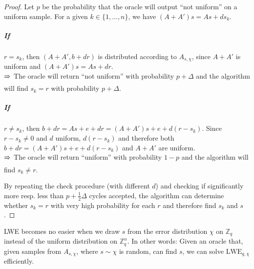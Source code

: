 \documentclass{report}
\newcommand{\Z}{\mathbb{Z}}
\begin{document}
\begin{proof}
Let $p$ be the probability that the oracle will output ``not uniform'' on a uniform sample. For a given $k \in \{ 1, ..., n\}$, we have $(A + A')s = As + ds_k$.

\subparagraph{If} $r = s_k$, then $(A + A', b + dr)$ is distributed according to $A_{s, \chi}$, since $A + A'$ is uniform and $(A + A')s = As + dr$.
\\$\xRightarrow{}$ The oracle will return ``not uniform'' with probability $p + \Delta$ and the algorithm will find $s_k = r$ with probability $p + \Delta$.

\subparagraph{If} $r \neq s_k$, then $b + dr = As + e + dr = (A + A')s + e + d(r - s_k)$. Since $r - s_k \neq 0$ and $d$ uniform, $d(r - s_k)$ and therefore both $b + dr = (A + A')s + e + d(r - s_k)$ and $A + A'$ are uniform.
\\$\xRightarrow{}$ The oracle will return ``uniform'' with probability $1 - p$ and the algorithm will find $s_k \neq r$.

By repeating the check procedure (with different $d$) and checking if significantly more resp. less than $p + \frac 1 2 \Delta$ cycles accepted, the algorithm can determine whether $s_k = r$ with very high probability for each $r$ and therefore find $s_k$ and $s$.\qedhere
\end{proof}

\label{secret_error_distribution}
LWE becomes no easier when we draw $s$ from the error distribution $\chi$ on $\Z_q$ instead of the uniform distribution on $\Z_q^n$. In other words: Given an oracle that, given samples from $A_{s, \chi}$, where $s \sim \chi$ is random, can find $s$, we can solve $\mathrm{LWE}_{q, \chi}$ efficiently.
\end{document}

